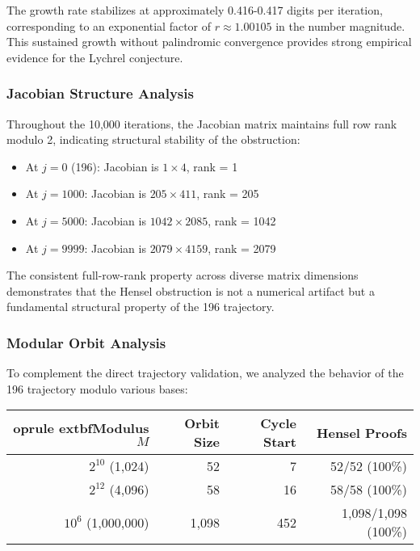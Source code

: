 \documentclass[12pt,a4paper]{article}
\begin{document}
The growth rate stabilizes at approximately 0.416-0.417 digits per iteration, 
corresponding to an exponential factor of $r \approx 1.00105$ in the number 
magnitude. This sustained growth without palindromic convergence provides 
strong empirical evidence for the Lychrel conjecture.

\subsubsection{Jacobian Structure Analysis}

Throughout the 10,000 iterations, the Jacobian matrix maintains full row 
rank modulo 2, indicating structural stability of the obstruction:

\begin{itemize}
\item At $j=0$ (196): Jacobian is $1 \times 4$, rank = 1
\item At $j=1000$: Jacobian is $205 \times 411$, rank = 205
\item At $j=5000$: Jacobian is $1042 \times 2085$, rank = 1042
\item At $j=9999$: Jacobian is $2079 \times 4159$, rank = 2079
\end{itemize}

The consistent full-row-rank property across diverse matrix dimensions 
demonstrates that the Hensel obstruction is not a numerical artifact but 
a fundamental structural property of the 196 trajectory.

\subsubsection{Modular Orbit Analysis}

To complement the direct trajectory validation, we analyzed the behavior 
of the 196 trajectory modulo various bases:

\begin{center}
\begin{tabular}{@{}r r r r@{}}
	oprule
	extbf{Modulus $M$} & \textbf{Orbit Size} & \textbf{Cycle Start} & \textbf{Hensel Proofs} \\
\midrule
$2^{10}$ (1,024) & 52 & 7 & 52/52 (100\%) \\
$2^{12}$ (4,096) & 58 & 16 & 58/58 (100\%) \\
$10^6$ (1,000,000) & 1,098 & 452 & 1,098/1,098 (100\%) \\
\bottomrule
\end{tabular}
\end{center}
\end{document}
